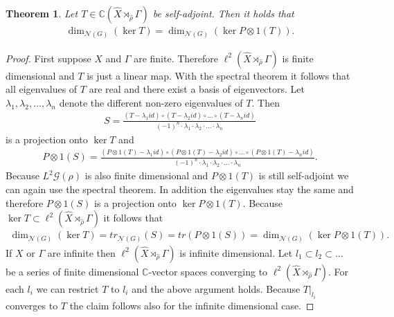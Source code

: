 \documentclass[12pt,a4paper]{scrartcl}
\theoremstyle{plain}
\newtheorem{Theorem}{Theorem}[section]
\theoremstyle{definition}
\numberwithin{equation}{section}
\newcommand{\C}{\mathbb{C}} %
\newcommand{\2}{\mathbb{Z} / 2 \mathbb{Z}}
\newcommand{\G}{\mathcal{G}}
\newcommand{\1}{\bar{1}}
\newcommand{\0}{\bar{0}}
\begin{document}
\begin{Theorem} \label{pontr_vNd}
	Let $T \in \C(\hat{X} \rtimes_{\hat{\rho}} \Gamma)$ be self-adjoint. Then it holds that
	\begin{align*}
		\dim_{\mathcal{N}(G)}(\ker T) = \dim_{\mathcal{N}(G)}(\ker P \otimes 1(T)).
	\end{align*}
\end{Theorem} 
\begin{proof}
	First suppose $X$ and $\Gamma$ are finite. Therefore $\ell^2(\hat{X} \rtimes_{\hat{\rho}} \Gamma)$ is finite dimensional and $T$ is just a linear map. With the spectral theorem it follows that all eigenvalues of $T$ are real and there exist a basis of eigenvectors. Let $\lambda_1, \lambda_2, \ldots, \lambda_n$ denote the different non-zero eigenvalues of $T$. Then
	\begin{align*}
		S = \frac{(T - \lambda_1 id) \circ (T - \lambda_2 id) \circ \ldots \circ (T - \lambda_n id)}{(-1)^n \cdot \lambda_1 \cdot \lambda_2 \cdot \ldots \cdot \lambda_n}
	\end{align*}
	is a projection onto $\ker T$ and 
	\begin{align*}
		P \otimes 1 (S) = \frac{(P \otimes 1(T) - \lambda_1 id) \circ (P \otimes 1(T) - \lambda_2 id) \circ \ldots \circ (P \otimes 1(T) - \lambda_n id)}{(-1)^n \cdot \lambda_1 \cdot \lambda_2 \cdot \ldots \cdot \lambda_n}.
	\end{align*}
	Because $L^2 \G (\rho)$ is also finite dimensional and $P \otimes 1(T)$ is still self-adjoint we can again use the spectral theorem. In addition the eigenvalues stay the same and therefore $P \otimes 1 (S)$ is a projection onto $\ker P \otimes 1 (T)$. Because $\ker T \subset \ell^2(\hat{X} \rtimes_{\hat{\rho}} \Gamma) $ it follows that
	\begin{align*}
		\dim_{\mathcal{N}(G)}(\ker T) = tr_{\mathcal{N}(G)}(S) = tr(P \otimes 1 (S)) = \dim_{\mathcal{N}(G)}(\ker P \otimes 1 (T)).
	\end{align*}
	If $X$ or $\Gamma$ are infinite then $\ell^2(\hat{X} \rtimes_{\hat{\rho}} \Gamma)$ is infinite dimensional. Let $l_1 \subset l_2 \subset \ldots$ be a series of finite dimensional $\C$-vector spaces converging to $\ell^2(\hat{X} \rtimes_{\hat{\rho}} \Gamma)$. For each $l_i$ we can restrict $T$ to $l_i$ and the above argument holds. Because $T|_{l_i}$ converges to $T$ the claim follows also for the infinite dimensional case.
\end{proof}
\end{document}
